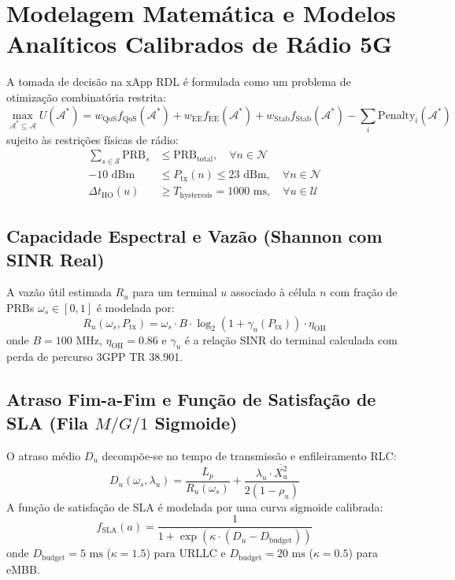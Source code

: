 \documentclass[12pt]{article}
\begin{document}
\section{Modelagem Matemática e Modelos Analíticos Calibrados de Rádio 5G}
A tomada de decisão na xApp RDL é formulada como um problema de otimização combinatória restrita:
\begin{equation}
    \max_{\mathcal{A}^* \subseteq \mathcal{A}} U(\mathcal{A}^*) = w_{\text{QoS}} f_{\text{QoS}}(\mathcal{A}^*) + w_{\text{EE}} f_{\text{EE}}(\mathcal{A}^*) + w_{\text{Stab}} f_{\text{Stab}}(\mathcal{A}^*) - \sum_{i} \text{Penalty}_i(\mathcal{A}^*)
\end{equation}
sujeito às restrições físicas de rádio:
\begin{align}
    \sum_{s \in \mathcal{S}} \text{PRB}_s &\le \text{PRB}_{\text{total}}, \quad \forall n \in \mathcal{N} \\
    -10\text{ dBm} &\le P_{\text{tx}}(n) \le 23\text{ dBm}, \quad \forall n \in \mathcal{N} \\
    \Delta t_{\text{HO}}(u) &\ge T_{\text{hysteresis}} = 1000\text{ ms}, \quad \forall u \in \mathcal{U}
\end{align}

\subsection{Capacidade Espectral e Vazão (Shannon com SINR Real)}
A vazão útil estimada $R_u$ para um terminal $u$ associado à célula $n$ com fração de PRBs $\omega_s \in [0, 1]$ é modelada por:
\begin{equation}
    R_u(\omega_s, P_{\text{tx}}) = \omega_s \cdot B \cdot \log_2 \left( 1 + \gamma_u(P_{\text{tx}}) \right) \cdot \eta_{\text{OH}}
\end{equation}
onde $B = 100\text{ MHz}$, $\eta_{\text{OH}} = 0.86$ e $\gamma_u$ é a relação SINR do terminal calculada com perda de percurso 3GPP TR 38.901.

\subsection{Atraso Fim-a-Fim e Função de Satisfação de SLA (Fila $M/G/1$ Sigmoide)}
O atraso médio $D_u$ decompõe-se no tempo de transmissão e enfileiramento RLC:
\begin{equation}
    D_u(\omega_s, \lambda_u) = \frac{L_p}{R_u(\omega_s)} + \frac{\lambda_u \cdot \overline{X_u^2}}{2(1 - \rho_u)}
\end{equation}
A função de satisfação de SLA é modelada por uma curva sigmoide calibrada:
\begin{equation}
    f_{\text{SLA}}(a) = \frac{1}{1 + \exp\left( \kappa \cdot (D_u - D_{\text{budget}}) \right)}
\end{equation}
onde $D_{\text{budget}} = 5\text{ ms}$ ($\kappa = 1.5$) para URLLC e $D_{\text{budget}} = 20\text{ ms}$ ($\kappa = 0.5$) para eMBB.
\end{document}

